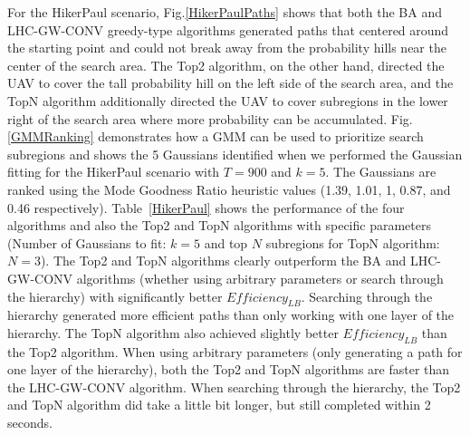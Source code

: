 For the HikerPaul scenario, Fig.\ref{HikerPaulPaths} shows that both the BA and LHC-GW-CONV greedy-type algorithms generated paths that centered around the starting point and could not break away from the probability hills near the center of the search area. The Top2 algorithm, on the other hand, directed the UAV to cover the tall probability hill on the left side of the search area, and the TopN algorithm additionally directed the UAV to cover subregions in the lower right of the search area where more probability can be accumulated. Fig.\ref{GMMRanking} demonstrates how a GMM can be used to prioritize search subregions and shows the 5 Gaussians identified when we performed the Gaussian fitting for the HikerPaul scenario with $T=900$ and $k=5$. The Gaussians are ranked using the Mode Goodness Ratio heuristic values (1.39, 1.01, 1, 0.87, and 0.46 respectively). Table~\ref{HikerPaul} shows the performance of the four algorithms and also the Top2 and TopN algorithms with specific parameters (Number of Gaussians to fit: $k=5$ and top $N$ subregions for TopN algorithm: $N=3$). The Top2 and TopN algorithms clearly outperform the BA and LHC-GW-CONV algorithms (whether using arbitrary parameters or search through the hierarchy) with significantly better $\mathit{Efficiency_{LB}}$. Searching through the hierarchy generated more efficient paths than only working with one layer of the hierarchy. The TopN algorithm also achieved slightly better $\mathit{Efficiency_{LB}}$ than the Top2 algorithm. When using arbitrary parameters (only generating a path for one layer of the hierarchy), both the Top2 and TopN algorithms are faster than the LHC-GW-CONV algorithm. When searching through the hierarchy, the Top2 and TopN algorithm did take a little bit longer, but still completed within 2 seconds.


